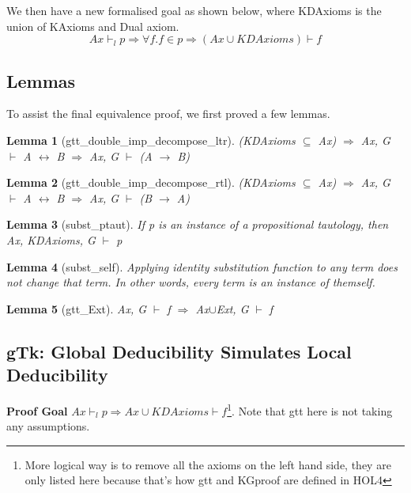 \documentclass[submission,copyright,creativecommons]{eptcs}
\newtheorem{lemma}{Lemma}
\begin{document}
We then have a new formalised goal as shown below, where KDAxioms is the union 
of KAxioms and Dual axiom.
$$Ax \vdash_l p \Rightarrow \forall f. f \in p \Rightarrow (Ax\cup KDAxioms) \vdash f$$


\subsection{Lemmas}
To assist the final equivalence proof, we first proved a few lemmas.

\begin{lemma}[gtt\_double\_imp\_decompose\_ltr]
(KDAxioms $\subseteq$ Ax) $\Rightarrow$  Ax, G $\vdash$ A $\leftrightarrow$ B $\Rightarrow$ Ax, G $\vdash$ (A $\rightarrow$ B)
\label{ltr}
\end{lemma}

\begin{lemma}[gtt\_double\_imp\_decompose\_rtl]
  (KDAxioms $\subseteq$ Ax) $\Rightarrow$  Ax, G $\vdash$ A $\leftrightarrow$ B $\Rightarrow$ Ax, G $\vdash$ (B $\rightarrow$ A)
  \label{rtl}
  \end{lemma}

\begin{lemma}[subst\_ptaut]
 If p is an instance of a propositional tautology, then Ax, KDAxioms, G $\vdash$ p 
\label{sp}
\end{lemma}

\begin{lemma}[subst\_self]
  Applying identity substitution function to any term does not change that term.
  In other words, every term is an instance of themself. 
\label{ss}
\end{lemma}

\begin{lemma}[gtt\_Ext]
  Ax, G $\vdash$ f $\Rightarrow$ Ax$\cup$Ext, G $\vdash$ f 
\label{ext}
\end{lemma}

\subsection{gTk: Global Deducibility Simulates Local Deducibility}
\textbf{Proof Goal} $Ax \vdash_l p \Rightarrow Ax \cup KDAxioms \vdash f$\footnote{More 
logical way is to remove all the 
axioms on the left hand side, they are only listed here because that's how gtt and KGproof 
are defined in HOL4}. Note that gtt here is not taking any assumptions.
\end{document}
